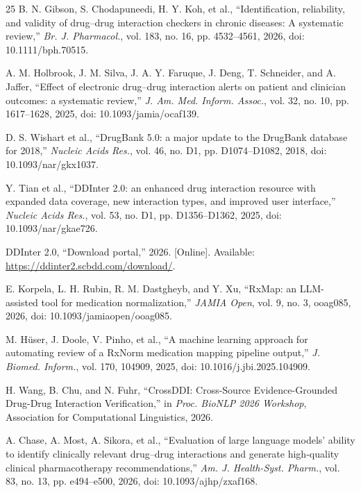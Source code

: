 \documentclass[11pt]{article}
\begin{document}
\begin{thebibliography}{25}
B. N. Gibson, S. Chodapuneedi, H. Y. Koh, et al.,
``Identification, reliability, and validity of drug--drug interaction checkers in chronic diseases: A systematic review,''
\emph{Br. J. Pharmacol.}, vol. 183, no. 16, pp. 4532--4561, 2026, doi: 10.1111/bph.70515.

A. M. Holbrook, J. M. Silva, J. A. Y. Faruque, J. Deng, T. Schneider, and A. Jaffer,
``Effect of electronic drug--drug interaction alerts on patient and clinician outcomes: a systematic review,''
\emph{J. Am. Med. Inform. Assoc.}, vol. 32, no. 10, pp. 1617--1628, 2025, doi: 10.1093/jamia/ocaf139.

D. S. Wishart et al., ``DrugBank 5.0: a major update to the DrugBank database for 2018,''
\emph{Nucleic Acids Res.}, vol. 46, no. D1, pp. D1074--D1082, 2018, doi: 10.1093/nar/gkx1037.

Y. Tian et al., ``DDInter 2.0: an enhanced drug interaction resource with expanded data coverage, new interaction types, and improved user interface,''
\emph{Nucleic Acids Res.}, vol. 53, no. D1, pp. D1356--D1362, 2025, doi: 10.1093/nar/gkae726.

DDInter 2.0, ``Download portal,'' 2026. [Online]. Available: \url{https://ddinter2.scbdd.com/download/}.

E. Korpela, L. H. Rubin, R. M. Dastgheyb, and Y. Xu,
``RxMap: an LLM-assisted tool for medication normalization,''
\emph{JAMIA Open}, vol. 9, no. 3, ooag085, 2026, doi: 10.1093/jamiaopen/ooag085.

M. H\"user, J. Doole, V. Pinho, et al.,
``A machine learning approach for automating review of a RxNorm medication mapping pipeline output,''
\emph{J. Biomed. Inform.}, vol. 170, 104909, 2025, doi: 10.1016/j.jbi.2025.104909.

H. Wang, B. Chu, and N. Fuhr, ``CrossDDI: Cross-Source Evidence-Grounded Drug-Drug Interaction Verification,'' in \emph{Proc. BioNLP 2026 Workshop}, Association for Computational Linguistics, 2026.

A. Chase, A. Most, A. Sikora, et al.,
``Evaluation of large language models' ability to identify clinically relevant drug--drug interactions and generate high-quality clinical pharmacotherapy recommendations,''
\emph{Am. J. Health-Syst. Pharm.}, vol. 83, no. 13, pp. e494--e500, 2026, doi: 10.1093/ajhp/zxaf168.


\end{thebibliography}
\end{document}
